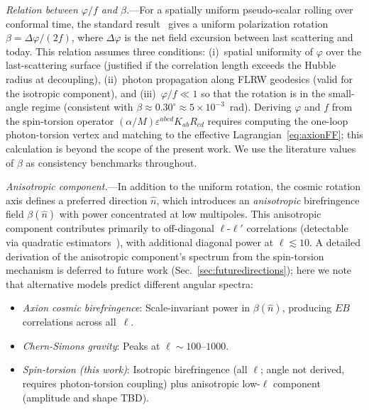 \documentclass[aps,prd,twocolumn,superscriptaddress,showpacs,preprintnumbers,nofootinbib,longbibliography,floatfix]{revtex4-2}
\begin{document}
\textit{Relation between $\varphi/f$ and $\beta$.}---For a spatially uniform pseudo-scalar rolling over conformal time, the standard result~\cite{Carroll1998} gives a uniform polarization rotation $\beta = \Delta\varphi/(2f)$, where $\Delta\varphi$ is the net field excursion between last scattering and today. This relation assumes three conditions: (i)~spatial uniformity of $\varphi$ over the last-scattering surface (justified if the correlation length exceeds the Hubble radius at decoupling), (ii)~photon propagation along FLRW geodesics (valid for the isotropic component), and (iii)~$\varphi/f\ll 1$ so that the rotation is in the small-angle regime (consistent with $\beta\approx 0.30^\circ \approx 5\times 10^{-3}$~rad). Deriving $\varphi$ and $f$ from the spin-torsion operator $(\alpha/M)\varepsilon^{abcd}K_{ab}R_{cd}$ requires computing the one-loop photon-torsion vertex and matching to the effective Lagrangian~\eqref{eq:axionFF}; this calculation is beyond the scope of the present work. We use the literature values of $\beta$ as consistency benchmarks throughout.

\textit{Anisotropic component.}---In addition to the uniform rotation, the cosmic rotation axis defines a preferred direction $\hat{n}$, which introduces an \textit{anisotropic} birefringence field $\beta(\hat{n})$ with power concentrated at low multipoles. This anisotropic component contributes primarily to off-diagonal $\ell$-$\ell'$ correlations (detectable via quadratic estimators~\cite{Eskilt2022}), with additional diagonal power at $\ell\lesssim 10$. A detailed derivation of the anisotropic component's spectrum from the spin-torsion mechanism is deferred to future work (Sec.~\ref{sec:futuredirections}); here we note that alternative models predict different angular spectra:
\begin{itemize}[leftmargin=*]
\item \textit{Axion cosmic birefringence}: Scale-invariant power in $\beta(\hat{n})$, producing $EB$ correlations across all~$\ell$.
\item \textit{Chern-Simons gravity}: Peaks at $\ell\sim 100$--$1000$.
\item \textit{Spin-torsion (this work)}: Isotropic birefringence (all $\ell$; angle not derived, requires photon-torsion coupling) plus anisotropic low-$\ell$ component (amplitude and shape TBD).
\end{itemize}
\end{document}
